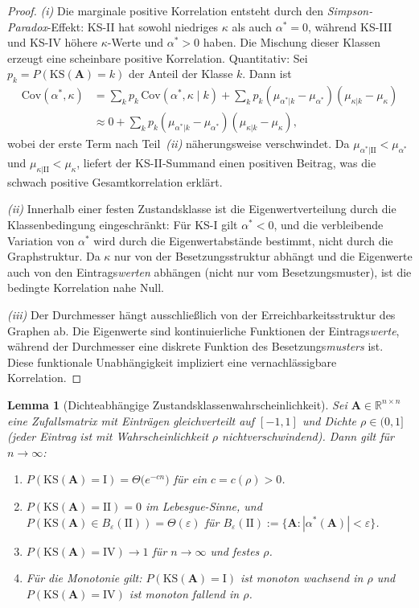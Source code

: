 \documentclass[a4paper, 12pt, twoside, openright]{report}
\newtheorem{lemma}[theorem]{Lemma}
\theoremstyle{definition}
\theoremstyle{definition}
\newcommand{\R}{\mathbb{R}}
\newcommand{\vA}{\bm{A}}
\newcommand{\KS}{\mathrm{KS}}
\begin{document}
\begin{proof}
\textit{(i)} Die marginale positive Korrelation entsteht durch den
\emph{Simpson-Paradox}-Effekt: KS-II hat sowohl niedriges $\kappa$ als auch
$\alpha^* = 0$, während KS-III und KS-IV höhere $\kappa$-Werte und $\alpha^* > 0$
haben. Die Mischung dieser Klassen erzeugt eine scheinbare positive Korrelation.
Quantitativ: Sei $p_k = P(\KS(\vA) = k)$ der Anteil der Klasse $k$. Dann ist
\begin{align*}
  \mathrm{Cov}(\alpha^*, \kappa)
  &= \sum_k p_k \,\mathrm{Cov}(\alpha^*, \kappa \mid k)
    + \sum_k p_k (\mu_{\alpha^*|k} - \mu_{\alpha^*})(\mu_{\kappa|k} - \mu_\kappa) \\
  &\approx 0 + \sum_k p_k (\mu_{\alpha^*|k} - \mu_{\alpha^*})(\mu_{\kappa|k} - \mu_\kappa),
\end{align*}
wobei der erste Term nach Teil~\textit{(ii)} näherungsweise verschwindet.
Da $\mu_{\alpha^*|\mathrm{II}} < \mu_{\alpha^*}$ und $\mu_{\kappa|\mathrm{II}} <
\mu_\kappa$, liefert der KS-II-Summand einen positiven Beitrag, was die
schwach positive Gesamtkorrelation erklärt.

\textit{(ii)} Innerhalb einer festen Zustandsklasse ist die Eigenwertverteilung
durch die Klassenbedingung eingeschränkt: Für KS-I gilt $\alpha^* < 0$, und die
verbleibende Variation von $\alpha^*$ wird durch die Eigenwertabstände bestimmt,
nicht durch die Graphstruktur. Da $\kappa$ nur von der Besetzungsstruktur abhängt
und die Eigenwerte auch von den Eintrags\emph{werten} abhängen (nicht nur vom
Besetzungsmuster), ist die bedingte Korrelation nahe Null.

\textit{(iii)} Der Durchmesser hängt ausschließlich von der Erreichbarkeitsstruktur
des Graphen ab. Die Eigenwerte sind kontinuierliche Funktionen der Eintrags\emph{werte},
während der Durchmesser eine diskrete Funktion des Besetzungs\emph{musters} ist. Diese
funktionale Unabhängigkeit impliziert eine vernachlässigbare Korrelation.
\end{proof}

\begin{lemma}[Dichteabhängige Zustandsklassenwahrscheinlichkeit]
\label{lem:dichte_ks}
Sei $\vA \in \R^{n \times n}$ eine Zufallsmatrix mit Einträgen gleichverteilt auf
$[-1,1]$ und Dichte $\rho \in (0,1]$ (jeder Eintrag ist mit Wahrscheinlichkeit $\rho$
nichtverschwindend). Dann gilt für $n \to \infty$:
\begin{enumerate}[label=(\roman*)]
  \item $P(\KS(\vA) = \mathrm{I}) = \Theta\bigl(e^{-cn}\bigr)$ für ein $c = c(\rho) > 0$.
  \item $P(\KS(\vA) = \mathrm{II}) = 0$ im Lebesgue-Sinne, und
    $P(\KS(\vA) \in B_\varepsilon(\mathrm{II})) = \Theta(\varepsilon)$ für
    $B_\varepsilon(\mathrm{II}) := \{\vA : |\alpha^*(\vA)| < \varepsilon\}$.
  \item $P(\KS(\vA) = \mathrm{IV}) \to 1$ für $n \to \infty$ und festes $\rho$.
  \item Für die Monotonie gilt: $P(\KS(\vA) = \mathrm{I})$ ist monoton wachsend in
    $\rho$ und $P(\KS(\vA) = \mathrm{IV})$ ist monoton fallend in $\rho$.
\end{enumerate}
\end{lemma}
\end{document}
